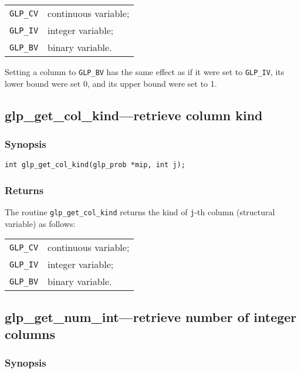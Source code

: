 \begin{tabular}{@{}ll}
\verb|GLP_CV| & continuous variable; \\
\verb|GLP_IV| & integer variable; \\
\verb|GLP_BV| & binary variable. \\
\end{tabular}


Setting a column to \verb|GLP_BV| has the same effect as if it were
set to \verb|GLP_IV|, its lower bound were set 0, and its upper bound
were set to 1.

\subsection{glp\_get\_col\_kind---retrieve column kind}

\subsubsection*{Synopsis}

\begin{verbatim}
int glp_get_col_kind(glp_prob *mip, int j);
\end{verbatim}

\subsubsection*{Returns}

The routine \verb|glp_get_col_kind| returns the kind of \verb|j|-th
column (structural variable) as follows:

\begin{tabular}{@{}ll}
\verb|GLP_CV| & continuous variable; \\
\verb|GLP_IV| & integer variable; \\
\verb|GLP_BV| & binary variable. \\
\end{tabular}

\subsection{glp\_get\_num\_int---retrieve number of integer columns}

\subsubsection*{Synopsis}

